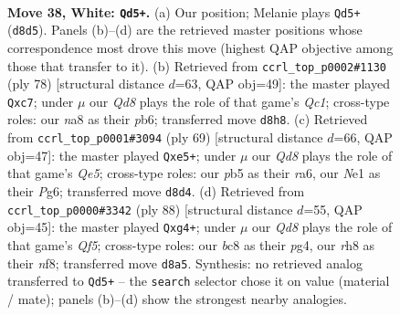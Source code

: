 \documentclass[11pt]{article}
\begin{document}
\clearpage

\begin{figure}[p]\centering
\begin{subfigure}{0.46\textwidth}\centering
\resizebox{\linewidth}{!}{%
\newchessgame
\chessboard[
  setfen={n1bQ3r/5k2/8/1p6/6pp/P2P1P2/7K/4Nq2 w - - 6 38},
  showmover=false,
  pgfstyle=straightmove, color=movearrow, markmove={d8-d5}
]}
\caption{}
\end{subfigure}\hfill
\begin{subfigure}{0.46\textwidth}\centering
\resizebox{\linewidth}{!}{%
\newchessgame
\chessboard[
  setfen={k7/2r5/1p2b3/4p2p/P7/3qN2p/5PP1/2Q3K1 w - - 0 40},
  showmover=false,
  pgfstyle=straightmove, color=movearrow, markmove={c1-c7}
]}
\caption{}
\end{subfigure}
\\[4pt]
\begin{subfigure}{0.46\textwidth}\centering
\resizebox{\linewidth}{!}{%
\newchessgame
\chessboard[
  setfen={3r2k1/5p2/R3P1pQ/1p2P2n/4q3/8/3R1P1K/8 b - - 0 35},
  showmover=false,
  pgfstyle=straightmove, color=movearrow, markmove={e4-e5}
]}
\caption{}
\end{subfigure}\hfill
\begin{subfigure}{0.46\textwidth}\centering
\resizebox{\linewidth}{!}{%
\newchessgame
\chessboard[
  setfen={5n2/6k1/3P4/p4Q2/6p1/7p/3qN1PP/7K w - - 0 45},
  showmover=false,
  pgfstyle=straightmove, color=movearrow, markmove={f5-g4}
]}
\caption{}
\end{subfigure}
\caption{\textbf{Move 38, White: \texttt{Qd5+}.} (a) Our position; Melanie plays \texttt{Qd5+} (\texttt{d8d5}). Panels (b)--(d) are the retrieved master positions whose correspondence most drove this move (highest QAP objective among those that transfer to it). (b) Retrieved from \texttt{ccrl\_top\_p0002\#1130} (ply 78) [structural distance $d$=63, QAP obj=49]: the master played \texttt{Qxc7}; under $\mu$ our \emph{Qd8} plays the role of that game's \emph{Qc1}; cross-type roles: our \emph{n}a8 as their \emph{p}b6; transferred move \texttt{d8h8}. (c) Retrieved from \texttt{ccrl\_top\_p0001\#3094} (ply 69) [structural distance $d$=66, QAP obj=47]: the master played \texttt{Qxe5+}; under $\mu$ our \emph{Qd8} plays the role of that game's \emph{Qe5}; cross-type roles: our \emph{p}b5 as their \emph{r}a6, our \emph{N}e1 as their \emph{P}g6; transferred move \texttt{d8d4}. (d) Retrieved from \texttt{ccrl\_top\_p0000\#3342} (ply 88) [structural distance $d$=55, QAP obj=45]: the master played \texttt{Qxg4+}; under $\mu$ our \emph{Qd8} plays the role of that game's \emph{Qf5}; cross-type roles: our \emph{b}c8 as their \emph{p}g4, our \emph{r}h8 as their \emph{n}f8; transferred move \texttt{d8a5}. Synthesis: no retrieved analog transferred to \texttt{Qd5+} -- the \texttt{search} selector chose it on value (material / mate); panels (b)--(d) show the strongest nearby analogies.}
\label{fig:thought-m74}
\end{figure}
\end{document}
